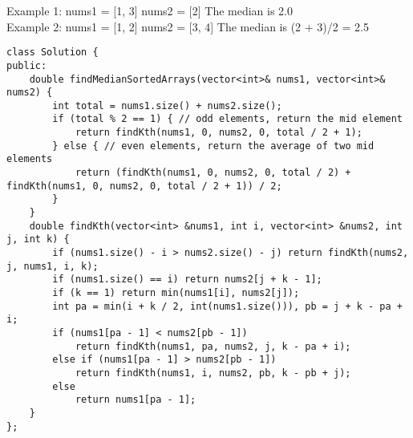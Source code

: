 Example 1:
nums1 = [1, 3]
nums2 = [2]
The median is 2.0\\

Example 2:
nums1 = [1, 2]
nums2 = [3, 4]
The median is (2 + 3)/2 = 2.5\\

\begin{lstlisting}
class Solution {
public:
    double findMedianSortedArrays(vector<int>& nums1, vector<int>& nums2) {
        int total = nums1.size() + nums2.size();
        if (total % 2 == 1) { // odd elements, return the mid element
            return findKth(nums1, 0, nums2, 0, total / 2 + 1);
        } else { // even elements, return the average of two mid elements
            return (findKth(nums1, 0, nums2, 0, total / 2) + findKth(nums1, 0, nums2, 0, total / 2 + 1)) / 2;
        }
    }
    double findKth(vector<int> &nums1, int i, vector<int> &nums2, int j, int k) {
        if (nums1.size() - i > nums2.size() - j) return findKth(nums2, j, nums1, i, k);
        if (nums1.size() == i) return nums2[j + k - 1];
        if (k == 1) return min(nums1[i], nums2[j]);
        int pa = min(i + k / 2, int(nums1.size())), pb = j + k - pa + i;
        if (nums1[pa - 1] < nums2[pb - 1]) 
            return findKth(nums1, pa, nums2, j, k - pa + i);
        else if (nums1[pa - 1] > nums2[pb - 1]) 
            return findKth(nums1, i, nums2, pb, k - pb + j);
        else 
            return nums1[pa - 1];
    }
};
\end{lstlisting}


